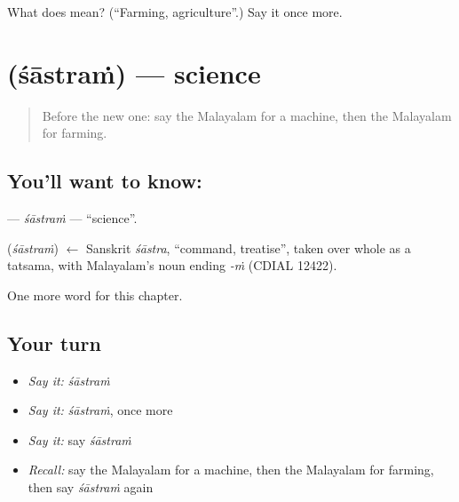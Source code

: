 \begin{tcolorbox}[breakable,colback=teal!4,colframe=teal!35!black,title={Before you move on}]
What does  mean? (\textquotedblleft{}Farming, agriculture\textquotedblright{}.) Say it once more.
\end{tcolorbox}
\section[\texorpdfstring{\ml{ശാസ്ത്രം} (śāstraṁ)}{ശാസ്ത്രം (śāstraṁ)}]{ (śāstraṁ) — science}

\label{lesson:ML-C336-sastram}



\begin{quote}
Before the new one: say the Malayalam for a machine, then the Malayalam for farming.
\end{quote}

\subsection*{You'll want to know: }
\textbf{} — \emph{śāstraṁ} — \textquotedblleft{}science\textquotedblright{}.

\begin{cousinweb}
\textbf{} (\emph{śāstraṁ}) $\leftarrow$ Sanskrit \emph{śāstra}, \textquotedblleft{}command, treatise\textquotedblright{}, taken over whole as a tatsama, with Malayalam's noun ending \emph{-ṁ} (CDIAL 12422).
\end{cousinweb}

\begin{grammarlens}[title={What you've built}]
One more word for this chapter.
\end{grammarlens}

\subsection*{Your turn}
\begin{itemize}
\raggedright
  \item \emph{Say it:} \emph{śāstraṁ}
  \item \emph{Say it:} \emph{śāstraṁ}, once more
  \item \emph{Say it:} say \emph{śāstraṁ}
  \item \emph{Recall:} say the Malayalam for a machine, then the Malayalam for farming, then say \emph{śāstraṁ} again
\end{itemize}

